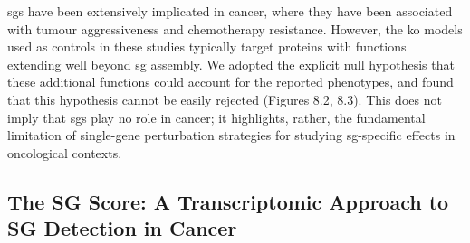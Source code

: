 \gls{sg}s have been extensively implicated in cancer, where they have been associated with tumour aggressiveness\cite{somasekharan_yb-1_2015, fonteneau_stress_2022} and chemotherapy resistance\cite{grabocka_mutant_2016}. However, the \gls{ko} models used as controls in these studies typically target proteins with functions extending well beyond \gls{sg} assembly. We adopted the explicit null hypothesis that these additional functions could account for the reported phenotypes, and found that this hypothesis cannot be easily rejected (Figures 8.2, 8.3). This does not imply that \gls{sg}s play no role in cancer; it highlights, rather, the fundamental limitation of single-gene perturbation strategies for studying \gls{sg}-specific effects in oncological contexts.

\subsection{The SG Score: A Transcriptomic Approach to SG Detection in Cancer}

